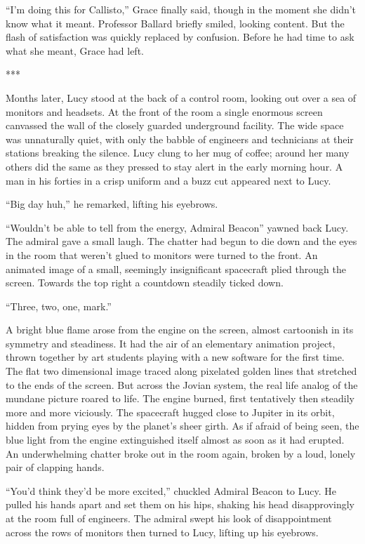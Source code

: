 \documentclass[openany, 12pt]{book} %
\begin{document}
``I'm doing this for Callisto,'' Grace finally said, though in the moment she didn't know what it meant. Professor Ballard briefly smiled, looking content. But the flash of satisfaction was quickly replaced by confusion. Before he had time to ask what she meant, Grace had left.

\begin{center}
***
\end{center}

Months later, Lucy stood at the back of a control room, looking out over a sea of monitors and headsets. At the front of the room a single enormous screen canvassed the wall of the closely guarded underground facility. The wide space was unnaturally quiet, with only the babble of engineers and technicians at their stations breaking the silence. Lucy clung to her mug of coffee; around her many others did the same as they pressed to stay alert in the early morning hour. A man in his forties in a crisp uniform and a buzz cut appeared next to Lucy.

``Big day huh,'' he remarked, lifting his eyebrows.

``Wouldn't be able to tell from the energy, Admiral Beacon'' yawned back Lucy. The admiral gave a small laugh. The chatter had begun to die down and the eyes in the room that weren't glued to monitors were turned to the front. An animated image of a small, seemingly insignificant spacecraft plied through the screen. Towards the top right a countdown steadily ticked down.

``Three, two, one, mark.''

A bright blue flame arose from the engine on the screen, almost cartoonish in its symmetry and steadiness. It had the air of an elementary animation project, thrown together by art students playing with a new software for the first time. The flat two dimensional image traced along pixelated golden lines that stretched to the ends of the screen. But across the Jovian system, the real life analog of the mundane picture roared to life. The engine burned, first tentatively then steadily more and more viciously. The spacecraft hugged close to Jupiter in its orbit, hidden from prying eyes by the planet's sheer girth. As if afraid of being seen, the blue light from the engine extinguished itself almost as soon as it had erupted. An underwhelming chatter broke out in the room again, broken by a loud, lonely pair of clapping hands.

``You'd think they'd be more excited,'' chuckled Admiral Beacon to Lucy. He pulled his hands apart and set them on his hips, shaking his head disapprovingly at the room full of engineers. The admiral swept his look of disappointment across the rows of monitors then turned to Lucy, lifting up his eyebrows. 
\end{document}
